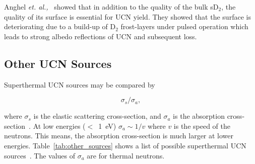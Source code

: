 Anghel {\it{et. al.,}}~\cite{anghel2018solid} showed that in addition
to the quality of the bulk sD$_2$, the quality of its surface is
essential for UCN yield. They showed that the surface is deteriorating
due to a build-up of D$_2$ frost-layers under pulsed operation which
leads to strong albedo reflections of UCN and subsequent loss.







\subsection{Other UCN Sources}
Superthermal UCN sources may be compared by

\begin{equation}
\sigma_s / \sigma_a,
\end{equation}

where $\sigma_s$ is the elastic scattering cross-section, and
$\sigma_a$ is the absorption
cross-section~\cite{Salvat2013,Atchison2009,Liu_thesis}. At low
energies ($<$~1~eV) $\sigma_a \sim 1/v$ where $v$ is the speed of the
neutrons. This means, the absorption cross-section is much larger at
lower energies.  Table~\ref{tab:other_sources} shows a list of
possible superthermal UCN sources~\cite{Liu_thesis}. The values of
$\sigma_a$ are for thermal neutrons.


